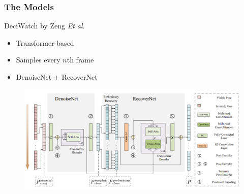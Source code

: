 \documentclass{beamer}
\begin{document}
\begin{frame}
    \frametitle{The Models}
    DeciWatch by Zeng \textit{Et al}.
    \begin{itemize}
        \item<1-> Transformer-based
        \item<1-> Samples every $n$th frame
        \item<1-> DenoiseNet + RecoverNet
    \end{itemize}
    \begin{figure}
        \centering
        \includegraphics[width = \textwidth]{../report/entities/deciwatch.PNG}
    \end{figure}
\end{frame}
\end{document}
